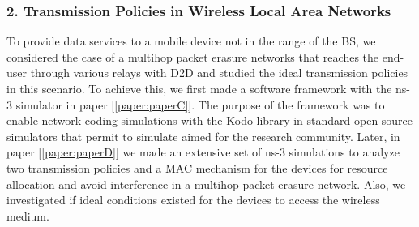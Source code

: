 \subsubsection{2. Transmission Policies in Wireless Local Area Networks}

To provide data services to a mobile device not in the range of the \ac{BS}, we considered the case of a multihop packet erasure networks that reaches the end-user through various relays with \ac{D2D} and studied the ideal transmission policies in this scenario. To achieve this, we first made a software framework with the ns-3 simulator in paper {[\ref{paper:paperC}]}. The purpose of the framework was to enable network coding simulations with the Kodo library in standard open source simulators that permit to simulate aimed for the research community. Later, in paper {[\ref{paper:paperD}]} we made an extensive set of ns-3 simulations to analyze two transmission policies and a \ac{MAC} mechanism for the devices for resource allocation and avoid interference in a multihop packet erasure network. Also, we investigated if ideal conditions existed for the devices to access the wireless medium.